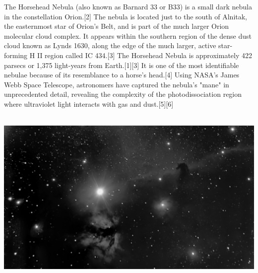 {\footnotesize\color{white}
The Horsehead Nebula (also known as Barnard 33 or B33) is a small dark nebula in the constellation Orion.[2] The nebula is located just to the south of Alnitak, the easternmost star of Orion's Belt, and is part of the much larger Orion molecular cloud complex. It appears within the southern region of the dense dust cloud known as Lynds 1630, along the edge of the much larger, active star-forming H II region called IC 434.[3] The Horsehead Nebula is approximately 422 parsecs or 1,375 light-years from Earth.[1][3] It is one of the most identifiable nebulae because of its resemblance to a horse's head.[4] Using NASA's James Webb Space Telescope, astronomers have captured the nebula's "mane" in unprecedented detail, revealing the complexity of the photodissociation region where ultraviolet light interacts with gas and dust.[5][6]



}\ \\
\includegraphics[width=\textwidth]{../Imaging//Grayscale/Horse_Head_Nebula.jpg}
